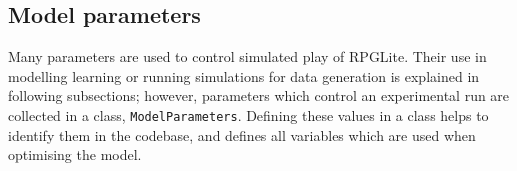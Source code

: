 




\subsection{Model parameters}
\label{subsec:exp1_model_parameters}

Many parameters are used to control simulated play of RPGLite. Their use in
modelling learning or running simulations for data generation is explained in
following subsections; however, parameters which control an experimental run are
collected in a class, \lstinline{ModelParameters}. Defining these values in a
class helps to identify them in the codebase, and defines all variables which
are used when optimising the model.

